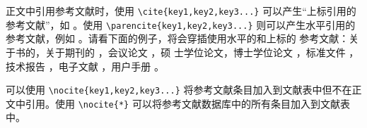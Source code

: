 正文中引用参考文献时，使用 \verb|\cite{key1,key2,key3...}| 可以产生“上标引用的
参考文献”，如 \cite{Meta_CN,chen2007act,DPMG}。使用
\verb|\parencite{key1,key2,key3...}| 则可以产生水平引用的参考文献，例如
\parencite{JohnD,zhubajie,IEEE-1363}。请看下面的例子，将会穿插使用水平的和上标的
参考文献：关于书的\parencite{Meta_CN,JohnD,IEEE-1363}，关于期刊的
\cite{chen2007act,chen2007ewi}，会议论文 \parencite{DPMG,kocher99,cnproceed}，硕
士学位论文\parencite{zhubajie,metamori2004}，博士学位论文
\cite{shaheshang,FistSystem01,bai2008}，标准文件 \parencite{IEEE-1363}，技术报告
\cite{NPB2}，电子文献 \parencite{xiaoyu2001, CHRISTINE1998}，用户手册
\parencite{RManual}。

可以使用 \verb|\nocite{key1,key2,key3...}| 将参考文献条目加入到文献表中但不在正
文中引用。使用 \verb|\nocite{*}| 可以将参考文献数据库中的所有条目加入到文献表
中。
